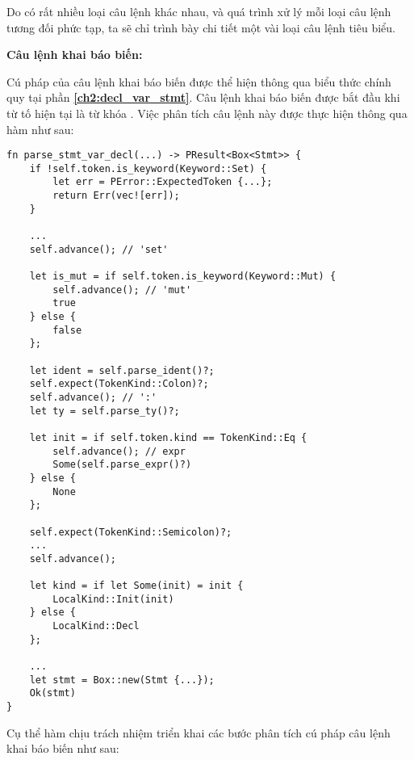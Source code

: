     Do có rất nhiều loại câu lệnh khác nhau, và quá trình xử lý mỗi loại câu lệnh tương đối phức tạp, ta sẽ chỉ trình bày chi tiết một vài loại câu lệnh tiêu biểu.

\noindent\textbf{Câu lệnh khai báo biến:}

    Cú pháp của câu lệnh khai báo biến được thể hiện thông qua biểu thức chính quy tại phần \textbf{\ref{ch2:decl_var_stmt}}. Câu lệnh khai báo biến được bắt đầu khi từ tố hiện tại là từ khóa . Việc phân tích câu lệnh này được thực hiện thông qua hàm  như sau:

\begin{lstlisting}[]
fn parse_stmt_var_decl(...) -> PResult<Box<Stmt>> {
    if !self.token.is_keyword(Keyword::Set) {
        let err = PError::ExpectedToken {...};
        return Err(vec![err]);
    }

    ...
    self.advance(); // 'set'

    let is_mut = if self.token.is_keyword(Keyword::Mut) {
        self.advance(); // 'mut'
        true
    } else {
        false
    };

    let ident = self.parse_ident()?;
    self.expect(TokenKind::Colon)?;
    self.advance(); // ':'
    let ty = self.parse_ty()?;

    let init = if self.token.kind == TokenKind::Eq {
        self.advance(); // expr
        Some(self.parse_expr()?)
    } else {
        None
    };

    self.expect(TokenKind::Semicolon)?;
    ...
    self.advance();

    let kind = if let Some(init) = init {
        LocalKind::Init(init)
    } else {
        LocalKind::Decl
    };

    ...
    let stmt = Box::new(Stmt {...});
    Ok(stmt)
}
\end{lstlisting}

    Cụ thể hàm  chịu trách nhiệm triển khai các bước phân tích cú pháp câu lệnh khai báo biến như sau:

